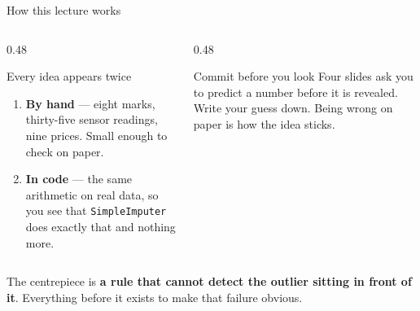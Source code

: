 \documentclass[aspectratio=169]{beamer}
\begin{document}
\begin{frame}[shrink=6]{How this lecture works}
  \begin{columns}[T]
    \begin{column}{0.48\textwidth}
      \begin{block}{Every idea appears twice}
        \begin{enumerate}
          \item \textbf{By hand} --- eight marks, thirty-five sensor readings,
            nine prices. Small enough to check on paper.
          \item \textbf{In code} --- the same arithmetic on real data, so you
            see that \texttt{SimpleImputer} does exactly that and nothing more.
        \end{enumerate}
      \end{block}
    \end{column}
    \begin{column}{0.48\textwidth}
      \begin{alertblock}{Commit before you look}
        Four slides ask you to predict a number before it is revealed. Write
        your guess down. Being wrong on paper is how the idea sticks.
      \end{alertblock}
    \end{column}
  \end{columns}
  \vspace{0.4em}
  \begin{center}
    \small The centrepiece is \textbf{a rule that cannot detect the outlier
    sitting in front of it}. Everything before it exists to make that failure
    obvious.
  \end{center}
\end{frame}
\end{document}

